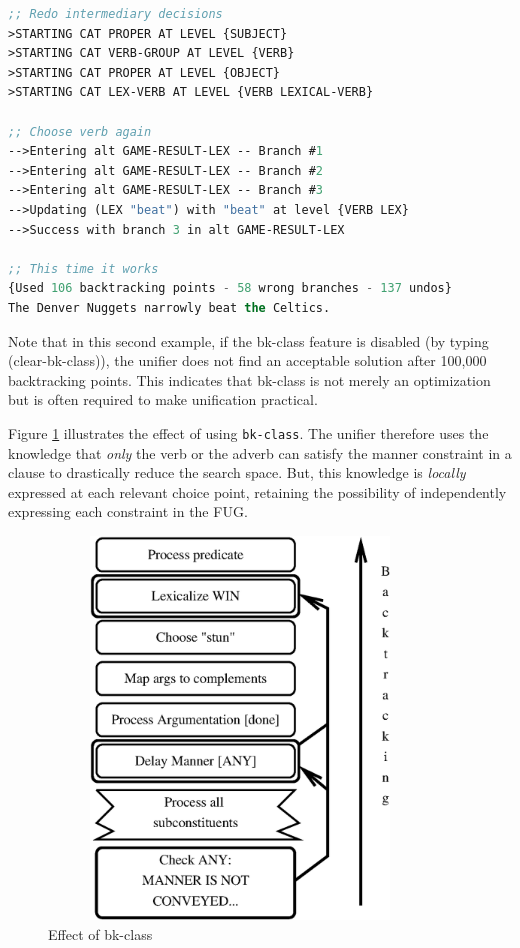 \documentclass[10pt,a4paper]{report}
\begin{document}
\begin{lstlisting}[language=Lisp]
;; Redo intermediary decisions
>STARTING CAT PROPER AT LEVEL {SUBJECT}
>STARTING CAT VERB-GROUP AT LEVEL {VERB}
>STARTING CAT PROPER AT LEVEL {OBJECT}
>STARTING CAT LEX-VERB AT LEVEL {VERB LEXICAL-VERB}

;; Choose verb again
-->Entering alt GAME-RESULT-LEX -- Branch #1
-->Entering alt GAME-RESULT-LEX -- Branch #2
-->Entering alt GAME-RESULT-LEX -- Branch #3
-->Updating (LEX "beat") with "beat" at level {VERB LEX}
-->Success with branch 3 in alt GAME-RESULT-LEX

;; This time it works
{Used 106 backtracking points - 58 wrong branches - 137 undos}
The Denver Nuggets narrowly beat the Celtics.
\end{lstlisting}

Note that in this second example, if the bk-class feature is disabled (by
typing (clear-bk-class)), the unifier does not find an acceptable solution
after 100,000 backtracking points.  This indicates that bk-class is not
merely an optimization but is often required to make unification practical.

Figure \ref{fig4:floating-stack2} illustrates the effect of using
{\tt bk-class}.  The unifier therefore uses the knowledge that {\em only} the
verb or the adverb can satisfy the manner constraint in a clause to
drastically reduce the search space.  But, this knowledge is {\em locally}
expressed at each relevant choice point, retaining the possibility of
independently expressing each constraint in the \textsc{FUG}.

\begin{figure}[p]
    \centering
    \includegraphics[width=4in, height=4in]{stack2.eps}
    \caption{Effect of bk-class}
    \label{fig4:floating-stack2}
\end{figure}
\end{document}
